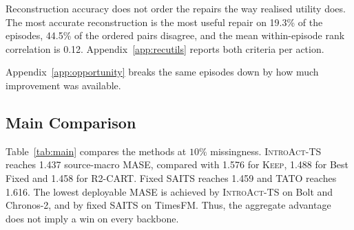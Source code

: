 \documentclass{article}
\newcommand{\introact}{\textsc{IntroAct-TS}}
\begin{document}
\begin{table}[t]
  \caption{Why the choice has to be made per request, over the evaluation episodes of all three
  backbones. Oracle-best share is how often an action attains the lowest realised loss of the
  catalog and the shares sum to one. The last two columns cover the episodes where the action
  applies and are measured against \textsc{Keep}.}
  \label{tab:heterogeneity}
  \centering
  \small
  \setlength{\tabcolsep}{4pt}
  \vspace{-2pt}
  {\footnotesize Reconstruction accuracy does not order the repairs the way realised utility
  does. The most accurate reconstruction is the most useful repair on 19.3\% of the
  episodes, 44.5\% of the ordered pairs disagree, and the mean within-episode
  rank correlation is 0.12. Appendix~\ref{app:recutils} reports both criteria per
  action.}
\end{table}

Appendix~\ref{app:opportunity} breaks the same episodes down by how much improvement was
available.

\subsection{Main Comparison}
\label{sec:exp-main}
Table~\ref{tab:main} compares the methods at $10\%$ missingness.
\introact{} reaches 1.437 source-macro MASE, compared with 1.576 for \textsc{Keep}, 1.488
for Best Fixed and 1.458 for R2-CART. Fixed SAITS reaches 1.459 and TATO reaches 1.616.
The lowest deployable MASE is achieved by \introact{} on Bolt and Chronos-2, and by fixed
SAITS on TimesFM. Thus, the aggregate advantage does not imply a win on every backbone.
\end{document}
